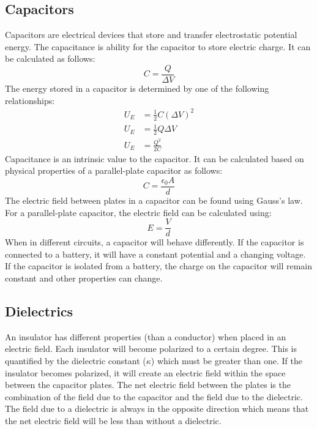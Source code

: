 \documentclass{article}
\begin{document}
        \subsection{Capacitors}
            Capacitors are electrical devices that store and transfer electrostatic potential energy. The capacitance is ability for the capacitor to store electric charge. It can be calculated as follows:
            \begin{equation}
                C = \frac{Q}{\Delta V}
            \end{equation}
            The energy stored in a capacitor is determined by one of the following relationships:
            \begin{align}
                U_E &= \frac{1}{2} C \left( \Delta V \right)^2 \\
                U_E &= \frac{1}{2} Q \Delta V \\
                U_E &= \frac{Q^2}{2 C}
            \end{align}
            Capacitance is an intrinsic value to the capacitor. It can be calculated based on physical properties of a parallel-plate capacitor as follows:
            \begin{equation}
                C = \frac{\epsilon_0 A}{d}
            \end{equation}
            The electric field between plates in a capacitor can be found using Gauss's law. For a parallel-plate capacitor, the electric field can be calculated using:
            \begin{equation}
                E = \frac{V}{d}
            \end{equation}
            When in different circuits, a capacitor will behave differently. If the capacitor is connected to a battery, it will have a constant potential and a changing voltage. If the capacitor is isolated from a battery, the charge on the capacitor will remain constant and other properties can change.

        \subsection{Dielectrics}
            An insulator has different properties (than a conductor) when placed in an electric field. Each insulator will become polarized to a certain degree. This is quantified by the dielectric constant ($\kappa$) which must be greater than one. If the insulator becomes polarized, it will create an electric field within the space between the capacitor plates. The net electric field between the plates is the combination of the field due to the capacitor and the field due to the dielectric. The field due to a dielectric is always in the opposite direction which means that the net electric field will be less than without a dielectric.
\end{document}
